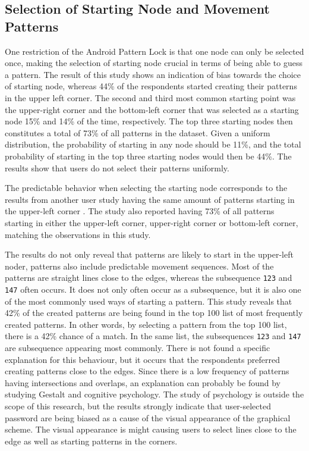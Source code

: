     \subsection{Selection of Starting Node and Movement Patterns}
      One restriction of the Android Pattern Lock is that one node can only be selected once, making the selection of starting node crucial in terms of being able to guess a pattern. The result of this study shows an indication of bias towards the choice of starting node, whereas 44\% of the respondents started creating their patterns in the upper left corner. The second and third most common starting point was the upper-right corner and the bottom-left corner that was selected as a starting node 15\% and 14\% of the time, respectively. The top three starting nodes then constitutes a total of 73\% of all patterns in the dataset. Given a uniform distribution, the probability of starting in any node should be 11\%, and the total probability of starting in the top three starting nodes would then be 44\%. The results show that users do not select their patterns uniformly.

      The predictable behavior when selecting the starting node corresponds to the results from another user study having the same amount of patterns starting in the upper-left corner \cite{Uellenbeck}. The study also reported having 73\% of all patterns starting in either the upper-left corner, upper-right corner or bottom-left corner, matching the observations in this study.

       The results do not only reveal that patterns are likely to start in the upper-left noder, patterns also include predictable movement sequences. Most of the patterns are straight lines close to the edges, whereas the subsequence \texttt{123} and \texttt{147} often occurs. It does not only often occur as a subsequence, but it is also one of the most commonly used ways of starting a pattern. This study reveals that 42\% of the created patterns are being found in the top 100 list of most frequently created patterns. In other words, by selecting a pattern from the top 100 list, there is a 42\% chance of a match. In the same list, the subsequences \texttt{123} and \texttt{147} are subsequence appearing most commonly. There is not found a specific explanation for this behaviour, but it occurs that the respondents preferred creating patterns close to the edges. Since there is a low frequency of patterns having intersections and overlaps, an explanation can probably be found by studying Gestalt and cognitive psychology. The study of psychology is outside the scope of this research, but the results strongly indicate that user-selected password are being biased as a cause of the visual appearance of the graphical scheme. The visual appearance is might causing users to select lines close to the edge as well as starting patterns in the corners.

